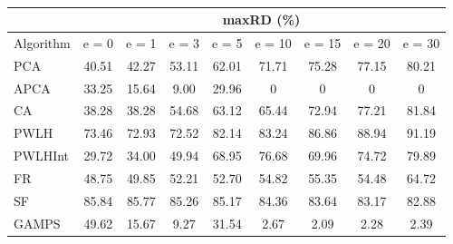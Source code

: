 \begin{table}[h]
\newcommand{\cpca}{\cellcolor{cyan!20}}
\newcommand{\capca}{\cellcolor{green!20}}
\newcommand{\cfr}{\cellcolor{yellow!25}}
\newcommand{\cgzip}{\cellcolor{orange!20}}
\newcommand{\best}{\cellcolor{gray!30}}
\centering\hspace*{0cm}\begin{tabular}{| l | c | c | c | c | c | c | c | c |}\cline{2-9}\multicolumn{1}{c|}{}& \multicolumn{8}{c|}{maxRD (\%)}\\\hline
{Algorithm} & {e = 0} & {e = 1} & {e = 3} & {e = 5} & {e = 10} & {e = 15} & {e = 20} & {e = 30} \\\hline
{PCA\cpca} & {40.51} & {42.27} & {53.11} & {62.01} & {71.71} & {75.28} & {77.15} & {80.21} \\\hline
{APCA\capca} & {33.25} & {\best15.64} & {\best9.00} & {\best29.96} & {\best0} & {\best0} & {\best0} & {\best0} \\\hline
{CA} & {38.28} & {38.28} & {54.68} & {63.12} & {65.44} & {72.94} & {77.21} & {81.84} \\\hline
{PWLH} & {73.46} & {72.93} & {72.52} & {82.14} & {83.24} & {86.86} & {88.94} & {91.19} \\\hline
{PWLHInt} & {\best29.72} & {34.00} & {49.94} & {68.95} & {76.68} & {69.96} & {74.72} & {79.89} \\\hline
{FR\cfr} & {48.75} & {49.85} & {52.21} & {52.70} & {54.82} & {55.35} & {54.48} & {64.72} \\\hline
{SF} & {85.84} & {85.77} & {85.26} & {85.17} & {84.36} & {83.64} & {83.17} & {82.88} \\\hline
{GAMPS} & {49.62} & {15.67} & {9.27} & {31.54} & {2.67} & {2.09} & {2.28} & {2.39} \\\hline
\end{tabular}
\caption{\captionminmaxone}
\label{experiments:minmaxone}
\end{table}
